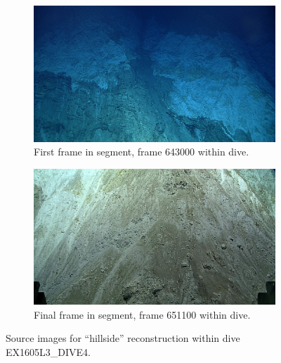 \documentclass[letterpaper,12pt]{article}
\begin{document}
\begin{figure}
    \centering
    \begin{subfigure}[b]{0.48\textwidth}
        \includegraphics[width=\textwidth]{images/image_643000.png}
        \caption{First frame in segment, frame 643000 within dive.}
        \label{fig:ex1605l3_dive4_hillside_begin}
    \end{subfigure}
    \begin{subfigure}[b]{0.48\textwidth}
        \includegraphics[width=\textwidth]{images/image_651100.png}
        \caption{Final frame in segment, frame 651100 within dive.}
        \label{fig:ex1605l3_dive4_hillside_end}
    \end{subfigure}
    \caption{Source images for ``hillside'' reconstruction within dive EX1605L3\_DIVE4.}
\end{figure}
\end{document}
